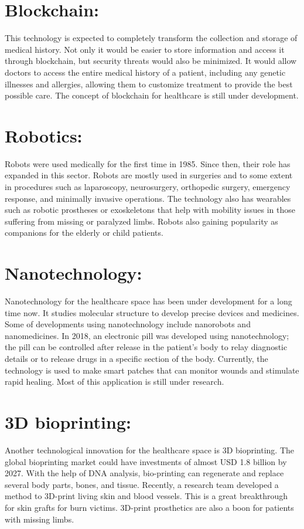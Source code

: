 \documentclass[12pt]{article}
\begin{document}
\section{Blockchain:}
This technology is expected to completely transform the collection and storage of medical history. Not only it would be easier to store information and access it through blockchain, but security threats would also be minimized. It would allow doctors to access the entire medical history of a patient, including any genetic illnesses and allergies, allowing them to customize treatment to provide the best possible care. The concept of blockchain for healthcare is still under development.
\section{Robotics:}
Robots were used medically for the first time in 1985. Since then, their role has expanded in this sector. Robots are mostly used in surgeries and to some extent in procedures such as laparoscopy, neurosurgery, orthopedic surgery, emergency response, and minimally invasive operations. The technology also has wearables such as robotic prostheses or exoskeletons that help with mobility issues in those suffering from missing or paralyzed limbs. Robots also gaining popularity as companions for the elderly or child patients.
\section{Nanotechnology:}
Nanotechnology for the healthcare space has been under development for a long time now. It studies molecular structure to develop precise devices and medicines. Some of developments using nanotechnology include nanorobots and nanomedicines. In 2018, an electronic pill was developed using nanotechnology; the pill can be controlled after release in the patient’s body to relay diagnostic details or to release drugs in a specific section of the body. Currently, the technology is used to make smart patches that can monitor wounds and stimulate rapid healing. Most of this application is still under research.
\section{3D bioprinting:}
 Another technological innovation for the healthcare space is 3D bioprinting. The global bioprinting market could have investments of almost USD 1.8 billion by 2027. With the help of DNA analysis, bio-printing can regenerate and replace several body parts, bones, and tissue. Recently, a research team developed a method to 3D-print living skin and blood vessels. This is a great breakthrough for skin grafts for burn victims. 3D-print prosthetics are also a boon for patients with missing limbs.
 
\end{document}
